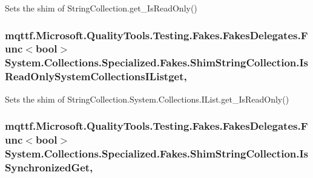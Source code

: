 Sets the shim of String\-Collection.\-get\-\_\-\-Is\-Read\-Only()

\hypertarget{class_system_1_1_collections_1_1_specialized_1_1_fakes_1_1_shim_string_collection_ad5691a9109b6143e5fc690814574e4c2}{
\subsubsection[{Is\-Read\-Only\-System\-Collections\-I\-Listget}]{\setlength{\rightskip}{0pt plus 5cm}mqttf.\-Microsoft.\-Quality\-Tools.\-Testing.\-Fakes.\-Fakes\-Delegates.\-Func$<$bool$>$ System.\-Collections.\-Specialized.\-Fakes.\-Shim\-String\-Collection.\-Is\-Read\-Only\-System\-Collections\-I\-Listget\hspace{0.3cm}{\ttfamily [get]}, {\ttfamily [set]}}}\label{class_system_1_1_collections_1_1_specialized_1_1_fakes_1_1_shim_string_collection_ad5691a9109b6143e5fc690814574e4c2}


Sets the shim of String\-Collection.\-System.\-Collections.\-I\-List.\-get\-\_\-\-Is\-Read\-Only()

\hypertarget{class_system_1_1_collections_1_1_specialized_1_1_fakes_1_1_shim_string_collection_ad1af8348b03b3b2f217d2b7db0700be4}{
\subsubsection[{Is\-Synchronized\-Get}]{\setlength{\rightskip}{0pt plus 5cm}mqttf.\-Microsoft.\-Quality\-Tools.\-Testing.\-Fakes.\-Fakes\-Delegates.\-Func$<$bool$>$ System.\-Collections.\-Specialized.\-Fakes.\-Shim\-String\-Collection.\-Is\-Synchronized\-Get\hspace{0.3cm}{\ttfamily [get]}, {\ttfamily [set]}}}\label{class_system_1_1_collections_1_1_specialized_1_1_fakes_1_1_shim_string_collection_ad1af8348b03b3b2f217d2b7db0700be4}


